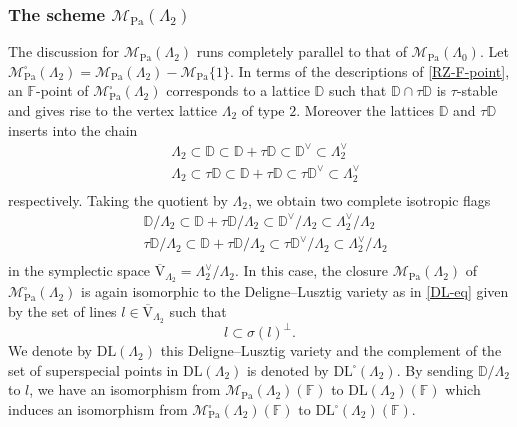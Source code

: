 \documentclass[10pt]{amsart}
\numberwithin{equation}{section}
\theoremstyle{definition}
\def\Pa{\mathrm{Pa}}
\def\calM{\mathcal{M}}
\def\DD{\mathbb{D}}
\def\FF{\mathbb{F}}
\def\rmV{\mathrm{V}}
\begin{document}
\subsubsection{The scheme $\calM_{\Pa}(\Lambda_{2})$} The discussion for $\calM_{\Pa}(\Lambda_{2})$ runs completely parallel to that of $\calM_{\Pa}(\Lambda_{0})$. Let $\calM^{\square}_{\Pa}(\Lambda_{2})=\calM_{\Pa}(\Lambda_{2})-\calM_{\Pa}\{1\}$. In terms of the descriptions of \ref{RZ-F-point}, an $\FF$-point of $\calM^{\square}_{\Pa}(\Lambda_{2})$ corresponds to a lattice $\DD$ such that $\DD\cap\tau\DD$ is $\tau$-stable and gives rise to the vertex lattice $\Lambda_{2}$ of type $2$. Moreover the lattices $\DD$ and  $\tau\DD$ inserts into the chain 
\begin{equation*}
\begin{aligned}
&\Lambda_{2}\subset \DD\subset \DD+\tau{\DD} \subset \DD^{\vee} \subset \Lambda^{\vee}_{2}\\
&\Lambda_{2}\subset \tau\DD\subset  \DD+\tau{\DD} \subset \tau\DD^{\vee} \subset \Lambda^{\vee}_{2}\\
\end{aligned}
\end{equation*}
respectively. Taking the quotient by $\Lambda_{2}$, we obtain two complete isotropic flags
\begin{equation*}
\begin{aligned}
&\DD/\Lambda_{2}\subset  \DD+\tau{\DD}/\Lambda_{2} \subset \DD^{\vee}/\Lambda_{2} \subset \Lambda^{\vee}_{2}/\Lambda_{2}\\
&\tau\DD/\Lambda_{2}\subset  \DD+\tau{\DD}/\Lambda_{2} \subset \tau\DD^{\vee}/\Lambda_{2} \subset \Lambda^{\vee}_{2}/\Lambda_{2}\\
\end{aligned}
\end{equation*}
in the symplectic space $\overline{\rmV}_{\Lambda_{2}}=\Lambda^{\vee}_{2}/\Lambda_{2}$. In this case, the closure $\calM_{\Pa}(\Lambda_{2})$ of $\calM^{\square}_{\Pa}(\Lambda_{2})$ is again isomorphic to the Deligne--Lusztig variety as in \ref{DL-eq} given by the set of lines $l\in\overline{\rmV}_{\Lambda_{2}}$ such that
\begin{equation*}
l\subset \sigma(l)^{\perp}.
\end{equation*}
We denote by $\mathrm{DL}(\Lambda_{2})$ this Deligne--Lusztig variety and the complement of the set of superspecial points in $\mathrm{DL}(\Lambda_{2})$ is denoted by $\mathrm{DL}^{\square}(\Lambda_{2})$. By sending $\DD/\Lambda_{2}$ to $l$, we have an isomorphism from $\calM_{\Pa}(\Lambda_{2})(\FF)$ to $\mathrm{DL}(\Lambda_{2})(\FF)$ which induces an isomorphism from $\calM^{\square}_{\Pa}(\Lambda_{2})(\FF)$ to $\mathrm{DL}^{\square}(\Lambda_{2})(\FF)$.
\end{document}
